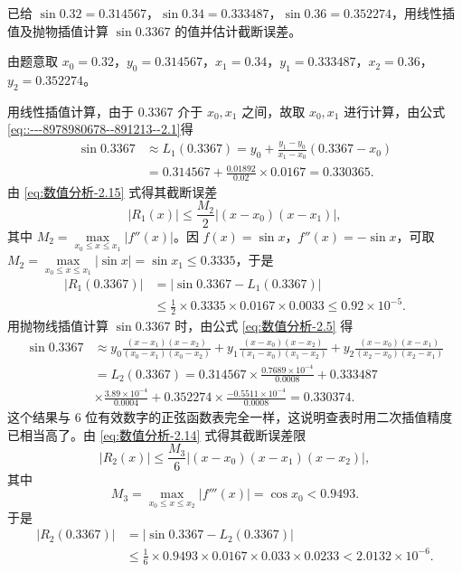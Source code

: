 \documentclass[../../main.tex]{subfiles}%
\begin{document}
\begin{example}
已给 $\sin 0.32 = 0.314567$，$\sin 0.34 = 0.333487$，$\sin 0.36 = 0.352274$，用线性插值及抛物插值计算 $\sin 0.3367$ 的值并估计截断误差。
\end{example}
\begin{solution}

由题意取 $x_0 = 0.32$，$y_0 = 0.314567$，$x_1 = 0.34$，$y_1 = 0.333487$，$x_2 = 0.36$，$y_2 = 0.352274$。

用线性插值计算，由于 $0.3367$ 介于 $x_0, x_1$ 之间，故取 $x_0, x_1$ 进行计算，由公式\eqref{eq::---8978980678--891213--2.1}得 
\begin{align*}
\sin 0.3367 &\approx L_1(0.3367) = y_0 + \frac{y_1 - y_0}{x_1 - x_0}(0.3367 - x_0) \\
&= 0.314567 + \frac{0.01892}{0.02} \times 0.0167 = 0.330365.
\end{align*}
由 \eqref{eq:数值分析-2.15} 式得其截断误差 
\[
|R_1(x)| \leqslant \frac{M_2}{2} |(x - x_0)(x - x_1)|,
\]
其中 $M_2 = \max\limits_{x_0 \leqslant x \leqslant x_1} |f''(x)|$。因 $f(x) = \sin x$，$f''(x) = -\sin x$，可取 $M_2 = \max\limits_{x_0 \leqslant x \leqslant x_1} |\sin x| = \sin x_1 \leqslant 0.3335$，于是 
\begin{align*}
|R_1(0.3367)| &= |\sin 0.3367 - L_1(0.3367)| \\
&\leqslant \frac{1}{2} \times 0.3335 \times 0.0167 \times 0.0033 \leqslant 0.92 \times 10^{-5}.
\end{align*}
用抛物线插值计算 $\sin 0.3367$ 时，由公式 \eqref{eq:数值分析-2.5} 得 
\begin{align*}
\sin 0.3367 &\approx y_0 \frac{(x - x_1)(x - x_2)}{(x_0 - x_1)(x_0 - x_2)} + y_1 \frac{(x - x_0)(x - x_2)}{(x_1 - x_0)(x_1 - x_2)} + y_2 \frac{(x - x_0)(x - x_1)}{(x_2 - x_0)(x_2 - x_1)} \\
&= L_2(0.3367) = 0.314567 \times \frac{0.7689 \times 10^{-4}}{0.0008} + 0.333487 \\
&\times \frac{3.89 \times 10^{-4}}{0.0004} + 0.352274 \times \frac{-0.5511 \times 10^{-4}}{0.0008} = 0.330374.
\end{align*}
这个结果与 6 位有效数字的正弦函数表完全一样，这说明查表时用二次插值精度已相当高了。由 \eqref{eq:数值分析-2.14} 式得其截断误差限 
\[
|R_2(x)| \leqslant \frac{M_3}{6} |(x - x_0)(x - x_1)(x - x_2)|,
\]
其中 
\[
M_3 = \max\limits_{x_0 \leqslant x \leqslant x_2} |f'''(x)| = \cos x_0 < 0.9493.
\]
于是 
\begin{align*}
|R_2(0.3367)| &= |\sin 0.3367 - L_2(0.3367)| \\
&\leqslant \frac{1}{6} \times 0.9493 \times 0.0167 \times 0.033 \times 0.0233 < 2.0132 \times 10^{-6}.
\end{align*}

\end{solution}
\end{document}

